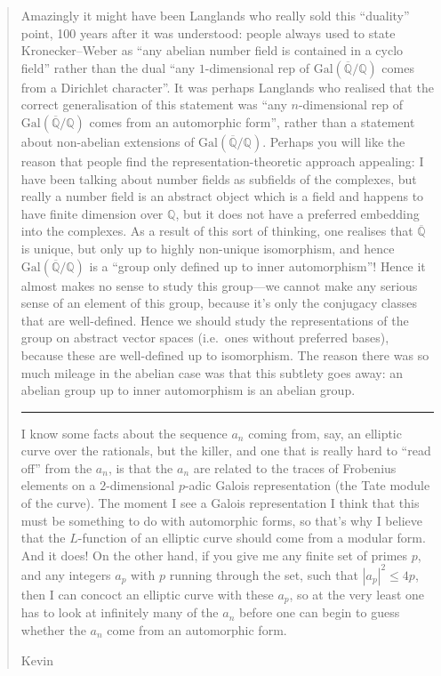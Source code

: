 \documentclass{article}
\begin{document}
\begin{quote}
Amazingly it might have been Langlands who really sold this ``duality''
point, 100 years after it was understood: people always used to state
Kronecker--Weber as ``any abelian number field is contained in a cyclo
field'' rather than the dual ``any \(1\)-dimensional rep of
\(\mathrm{Gal}(\overline{\mathbb{Q}}/\mathbb{Q})\) comes from a
Dirichlet character''. It was perhaps Langlands who realised that the
correct generalisation of this statement was ``any \(n\)-dimensional rep
of \(\mathrm{Gal}(\overline{\mathbb{Q}}/\mathbb{Q})\) comes from an
automorphic form'', rather than a statement about non-abelian extensions
of \(\mathrm{Gal}(\overline{\mathbb{Q}}/\mathbb{Q})\). Perhaps you will
like the reason that people find the representation-theoretic approach
appealing: I have been talking about number fields as subfields of the
complexes, but really a number field is an abstract object which is a
field and happens to have finite dimension over \(\mathbb{Q}\), but it
does not have a preferred embedding into the complexes. As a result of
this sort of thinking, one realises that \(\overline{\mathbb{Q}}\) is
unique, but only up to highly non-unique isomorphism, and hence
\(\mathrm{Gal}(\overline{\mathbb{Q}}/\mathbb{Q})\) is a ``group only
defined up to inner automorphism''! Hence it almost makes no sense to
study this group---we cannot make any serious sense of an element of
this group, because it's only the conjugacy classes that are
well-defined. Hence we should study the representations of the group on
abstract vector spaces (i.e.~ones without preferred bases), because
these are well-defined up to isomorphism. The reason there was so much
mileage in the abelian case was that this subtlety goes away: an abelian
group up to inner automorphism is an abelian group.

\begin{center}\rule{0.5\linewidth}{0.5pt}\end{center}

I know some facts about the sequence \(a_n\) coming from, say, an
elliptic curve over the rationals, but the killer, and one that is
really hard to ``read off'' from the \(a_n\), is that the \(a_n\) are
related to the traces of Frobenius elements on a \(2\)-dimensional
\(p\)-adic Galois representation (the Tate module of the curve). The
moment I see a Galois representation I think that this must be something
to do with automorphic forms, so that's why I believe that the
\(L\)-function of an elliptic curve should come from a modular form. And
it does! On the other hand, if you give me any finite set of primes
\(p\), and any integers \(a_p\) with \(p\) running through the set, such
that \(|a_p|^2\leqslant 4p\), then I can concoct an elliptic curve with
these \(a_p\), so at the very least one has to look at infinitely many
of the \(a_n\) before one can begin to guess whether the \(a_n\) come
from an automorphic form.

Kevin
\end{quote}
\end{document}
